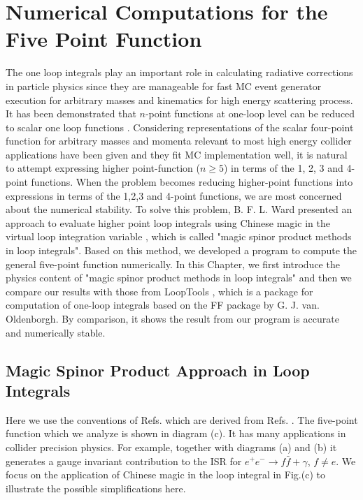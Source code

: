 \chapter{Numerical Computations for the Five Point Function}
The one loop integrals play an important role in calculating radiative corrections in particle physics since they are manageable for fast MC event generator execution for arbitrary masses and kinematics for high energy scattering process. It has been demonstrated that $n$-point functions at one-loop level can be reduced to scalar one loop functions \cite{Denner, PV}. Considering representations of the scalar four-point function for arbitrary masses and momenta relevant to most high energy collider applications have been given and they fit MC implementation well, it is natural to attempt expressing higher point-function ($n\ge5$) in terms of the 1, 2, 3 and 4-point functions. When the problem becomes reducing higher-point functions into expressions in terms of the 1,2,3 and 4-point functions, we are most concerned about the numerical stability. To solve this problem,  B. F. L. Ward presented an approach to evaluate higher point loop integrals using Chinese magic in the virtual loop integration variable \cite{MagicSpinor}, which is called "magic spinor product methods in loop integrals". Based on this method, we developed a program to compute the general five-point function numerically. In this Chapter, we first introduce the physics content of "magic spinor product methods in loop integrals" and then we compare our results with those from LoopTools \cite{LT}, which is a package for computation of one-loop integrals based on the FF package by G. J. van. Oldenborgh\cite{vOV90}. By comparison, it shows the result from our program is accurate and numerically stable.





\section{Magic Spinor Product Approach in Loop Integrals}



Here we use the conventions of Refs. \cite{GPS,JWZ2001prd} which are derived from Refs. \cite{ChnMag,KS}. The five-point function which we analyze is shown in diagram (c). It has many applications in collider precision physics. For example, together with diagrams (a) and (b) it generates a gauge invariant contribution to the ISR for $e^+e^-\to f\bar{f}+\gamma$, $f\neq e$. We focus on the application of Chinese magic in the loop integral in Fig.(c) to illustrate the possible simplifications here.

